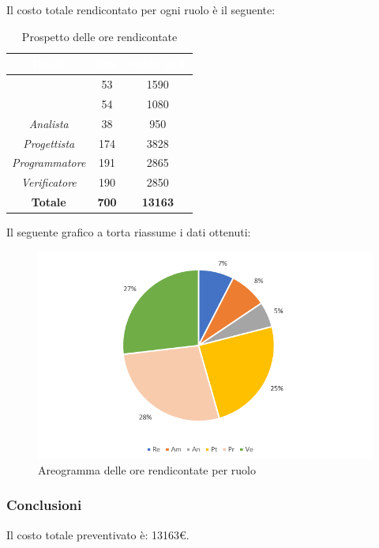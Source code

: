 \newpage
{}
Il costo totale rendicontato per ogni ruolo è il seguente:
\begin{table}[H]
	\begin{center}
		\begin{tabular}{ |c c c| }
		\rowcolor{darkblue} 
		\textcolor{white}{\textbf{Ruolo}} & \textcolor{white}{\textbf{Ore}} & \textcolor{white}{\textbf{Costo in €}}\\ \hline
		{\Responsabile} 			& 53 	& 1590 \\ \hline
		{\Amministratore}			& 54 	& 1080 \\ \hline
		\textit{Analista} 			& 38 	& 950 \\ \hline
		\textit{Progettista} 		& 174 	& 3828 \\ \hline
		\textit{Programmatore} 		& 191 	& 2865 \\ \hline
		\textit{Verificatore} 		& 190 	& 2850 \\ \hline
		\textbf{Totale} & \textbf{700} & \textbf{13163} \\ \hline
		\end{tabular}
	\caption{Prospetto delle ore rendicontate}
	\end{center}
\end{table}
Il seguente grafico a torta riassume i dati ottenuti:
\begin{figure}[H]
    \centering
    \includegraphics[scale = 0.75]{Immagini/TotaleRendicontatoTorta.png}
    \caption{Areogramma delle ore rendicontate per ruolo}
    \label{fig:Areogramma ripartizione ore totali rendicontate}
\end{figure}
\subsubsection{Conclusioni}
Il costo totale preventivato è: 13163€.